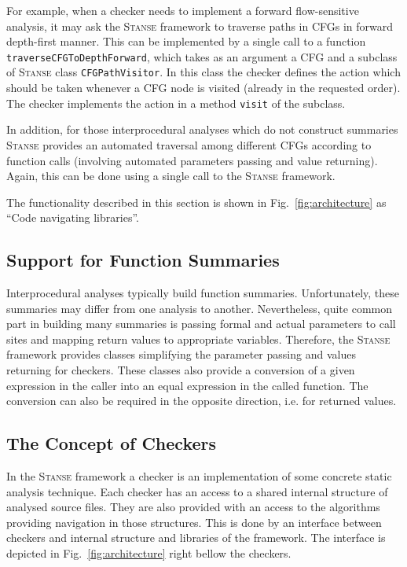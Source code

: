 \documentclass{llncs}
\newcommand{\Stanse}{\textsc{Stanse}\xspace}
\begin{document}
For example, when a checker needs to implement a forward flow-sensitive analysis,
it may ask the \Stanse framework to traverse paths in CFGs in forward
depth-first manner. This can be implemented by a single call to a
function \texttt{traverseCFGToDepthForward}, which takes as an argument a
CFG and a subclass of \Stanse class \texttt{CFGPathVisitor}. In this class
the checker defines the action which should be taken whenever a CFG
node is visited (already in the requested order). The checker implements the
action in a method \texttt{visit} of the subclass.

In addition, for those interprocedural analyses which do not construct
summaries \Stanse provides an automated traversal among different CFGs
according to function calls (involving automated parameters passing and
value returning). Again, this can be done using a single call to the \Stanse
framework.  

The functionality described in this section is shown in Fig.~\ref{fig:architecture} as
``Code navigating libraries''.


\subsection{Support for Function Summaries}
\label{ssec:summaries}

Interprocedural analyses typically build function summaries. Unfortunately,
these summaries may differ from one analysis to another. Nevertheless, quite
common part in building many summaries is passing formal and actual parameters
to call sites and mapping return values to appropriate variables. Therefore,
the \Stanse framework provides classes simplifying the parameter passing and
values returning for checkers. These classes also provide a conversion of a
given expression in the caller into an equal expression in the called
function. The conversion can also be required in the opposite direction, i.e.
for returned values.

\subsection{The Concept of Checkers}

In the \Stanse framework a checker is an implementation of some concrete
static analysis technique. Each checker has an access to a shared internal
structure of analysed source files. They are also provided with an access to
the algorithms providing navigation in those structures. This is done by an
interface between checkers and internal structure and libraries of the
framework. The interface is depicted in Fig.~\ref{fig:architecture} right
bellow the checkers.
\end{document}
